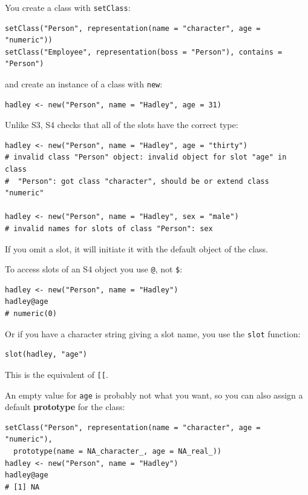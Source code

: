 You create a class with \texttt{setClass}:

\begin{verbatim}
setClass("Person", representation(name = "character", age = "numeric"))
setClass("Employee", representation(boss = "Person"), contains = "Person")
\end{verbatim}

and create an instance of a class with \texttt{new}:

\begin{verbatim}
hadley <- new("Person", name = "Hadley", age = 31)
\end{verbatim}

Unlike S3, S4 checks that all of the slots have the correct type:

\begin{verbatim}
hadley <- new("Person", name = "Hadley", age = "thirty")
# invalid class "Person" object: invalid object for slot "age" in class
#  "Person": got class "character", should be or extend class "numeric"

hadley <- new("Person", name = "Hadley", sex = "male")
# invalid names for slots of class "Person": sex
\end{verbatim}

If you omit a slot, it will initiate it with the default object of the
class.

To access slots of an S4 object you use \texttt{@}, not \texttt{\$}:

\begin{verbatim}
hadley <- new("Person", name = "Hadley")
hadley@age
# numeric(0)
\end{verbatim}

Or if you have a character string giving a slot name, you use the
\texttt{slot} function:

\begin{verbatim}
slot(hadley, "age")
\end{verbatim}

This is the equivalent of \texttt{{[}{[}}.

An empty value for \texttt{age} is probably not what you want, so you
can also assign a default \textbf{prototype} for the class:

\begin{verbatim}
setClass("Person", representation(name = "character", age = "numeric"), 
  prototype(name = NA_character_, age = NA_real_))
hadley <- new("Person", name = "Hadley")
hadley@age
# [1] NA
\end{verbatim}

